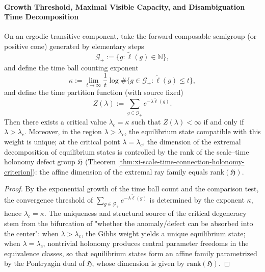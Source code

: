 \paragraph{Growth Threshold, Maximal Visible Capacity, and Disambiguation Time Decomposition}

\begin{theorem}\label{thm:xi-time-phase-transition-growth-and-defect-rank}
On an ergodic transitive component, take the forward composable semigroup (or positive cone) generated by elementary steps
\[
\mathcal G_+:=\{g:\widetilde{\ell}(g)\in\mathbb N\},
\]
and define the time ball counting exponent
\[
\kappa:=\lim_{t\to\infty}\frac{1}{t}\log \#\{g\in\mathcal G_+:\widetilde{\ell}(g)\le t\},
\]
and define the time partition function (with source fixed)
\[
Z(\lambda):=\sum_{g\in\mathcal G_+} e^{-\lambda \widetilde{\ell}(g)}.
\]
Then there exists a critical value \(\lambda_c=\kappa\) such that \(Z(\lambda)<\infty\) if and only if \(\lambda>\lambda_c\).
Moreover, in the region \(\lambda>\lambda_c\), the equilibrium state compatible with this weight is unique; at the critical point \(\lambda=\lambda_c\), the dimension of the extremal decomposition of equilibrium states is controlled by the rank of the scale--time holonomy defect group \(\mathfrak H\) (Theorem \ref{thm:xi-scale-time-connection-holonomy-criterion}): the affine dimension of the extremal ray family equals \(\mathrm{rank}(\mathfrak H)\).
\end{theorem}

\begin{proof}
By the exponential growth of the time ball count and the comparison test, the convergence threshold of \(\sum_{g\in\mathcal G_+} e^{-\lambda\widetilde\ell(g)}\) is determined by the exponent \(\kappa\), hence \(\lambda_c=\kappa\).
The uniqueness and structural source of the critical degeneracy stem from the bifurcation of "whether the anomaly/defect can be absorbed into the center": when \(\lambda>\lambda_c\), the Gibbs weight yields a unique equilibrium state; when \(\lambda=\lambda_c\), nontrivial holonomy produces central parameter freedoms in the equivalence classes, so that equilibrium states form an affine family parametrized by the Pontryagin dual of \(\mathfrak H\), whose dimension is given by \(\mathrm{rank}(\mathfrak H)\).
\end{proof}


